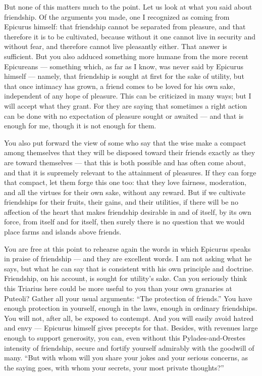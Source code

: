  But none of this matters much to the point. Let us look at what you said about friendship. Of the arguments you made, one I recognized as coming from Epicurus himself: that friendship cannot be separated from pleasure, and that therefore it is to be cultivated, because without it one cannot live in security and without fear, and therefore cannot live pleasantly either. That answer is sufficient. But you also adduced something more humane from the more recent Epicureans — something which, as far as I know, was never said by Epicurus himself — namely, that friendship is sought at first for the sake of utility, but that once intimacy has grown, a friend comes to be loved for his own sake, independent of any hope of pleasure. This can be criticized in many ways; but I will accept what they grant. For they are saying that sometimes a right action can be done with no expectation of pleasure sought or awaited — and that is enough for me, though it is not enough for them.

 You also put forward the view of some who say that the wise make a compact among themselves that they will be disposed toward their friends exactly as they are toward themselves — that this is both possible and has often come about, and that it is supremely relevant to the attainment of pleasures. If they can forge that compact, let them forge this one too: that they love fairness, moderation, and all the virtues for their own sake, without any reward. But if we cultivate friendships for their fruits, their gains, and their utilities, if there will be no affection of the heart that makes friendship desirable in and of itself, by its own force, from itself and for itself, then surely there is no question that we would place farms and islands above friends.

 You are free at this point to rehearse again the words in which Epicurus speaks in praise of friendship — and they are excellent words. I am not asking what he says, but what he can say that is consistent with his own principle and doctrine. Friendship, on his account, is sought for utility's sake. Can you seriously think this Triarius here could be more useful to you than your own granaries at Puteoli? Gather all your usual arguments: ``The protection of friends.'' You have enough protection in yourself, enough in the laws, enough in ordinary friendships. You will not, after all, be exposed to contempt. And you will easily avoid hatred and envy — Epicurus himself gives precepts for that. Besides, with revenues large enough to support generosity, you can, even without this Pylades-and-Orestes intensity of friendship, secure and fortify yourself admirably with the goodwill of many. ``But with whom will you share your jokes and your serious concerns, as the saying goes, with whom your secrets, your most private thoughts?''

